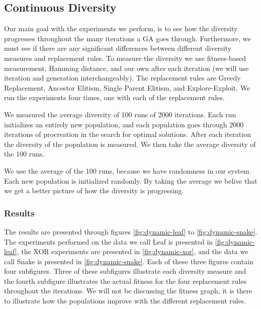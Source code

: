 \subsection{Continuous Diversity}
\label{sec:continuousdiversity}

Our main goal with the experiments we perform, is to see how the diversity progresses throughout the many iterations a GA goes through. Furthermore, we must see if there are any significant differences between different diversity measures and replacement rules. To measure the diversity we use fitness-based measurement, Hamming distance, and our own \dia{} after each iteration (we will use iteration and generation interchangeably). The replacement rules are Greedy Replacement, Ancestor Elitism, Single Parent Elitism, and Explore-Exploit. We run the experiments four times, one with each of the replacement rules.

We measured the average diversity of \num{100} runs of \num{2000} iterations. Each run initializes an entirely new population, and each population goes through \num{2000} iterations of procreation in the search for optimal solutions. After each iteration the diversity of the population is measured. We then take the average diversity of the \num{100} runs. %

We use the average of the \num{100} runs, because we have randomness in our system. Each new population is initialized randomly. By taking the average we belive that we get a better picture of how the diversity is progressing.

\subsubsection{Results}
The results are presented through figures \ref{fig:dynamic-leaf} to \ref{fig:dynamic-snake}. The experiments performed on the data we call Leaf is presented in \cref{fig:dynamic-leaf}, the XOR experiments are presented in \cref{fig:dynamic-xor}, and the data we call Snake is presented in \cref{fig:dynamic-snake}. Each of these three figures contain four subfigures. Three of these subfigures illustrate each diversity measure and the fourth subfigure illustrates the actual fitness for the four replacement rules throughout the iterations. We will not be discussing the fitness graph, it is there to illustrate how the populations improve with the different replacement rules.

